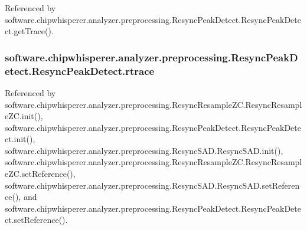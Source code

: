 Referenced by software.\+chipwhisperer.\+analyzer.\+preprocessing.\+Resync\+Peak\+Detect.\+Resync\+Peak\+Detect.\+get\+Trace().

\hypertarget{classsoftware_1_1chipwhisperer_1_1analyzer_1_1preprocessing_1_1ResyncPeakDetect_1_1ResyncPeakDetect_aa3ac6bab8c441f51c9d6fdf6798285fa}{}
\subsubsection[{rtrace}]{\setlength{\rightskip}{0pt plus 5cm}software.\+chipwhisperer.\+analyzer.\+preprocessing.\+Resync\+Peak\+Detect.\+Resync\+Peak\+Detect.\+rtrace}\label{classsoftware_1_1chipwhisperer_1_1analyzer_1_1preprocessing_1_1ResyncPeakDetect_1_1ResyncPeakDetect_aa3ac6bab8c441f51c9d6fdf6798285fa}


Referenced by software.\+chipwhisperer.\+analyzer.\+preprocessing.\+Resync\+Resample\+Z\+C.\+Resync\+Resample\+Z\+C.\+init(), software.\+chipwhisperer.\+analyzer.\+preprocessing.\+Resync\+Peak\+Detect.\+Resync\+Peak\+Detect.\+init(), software.\+chipwhisperer.\+analyzer.\+preprocessing.\+Resync\+S\+A\+D.\+Resync\+S\+A\+D.\+init(), software.\+chipwhisperer.\+analyzer.\+preprocessing.\+Resync\+Resample\+Z\+C.\+Resync\+Resample\+Z\+C.\+set\+Reference(), software.\+chipwhisperer.\+analyzer.\+preprocessing.\+Resync\+S\+A\+D.\+Resync\+S\+A\+D.\+set\+Reference(), and software.\+chipwhisperer.\+analyzer.\+preprocessing.\+Resync\+Peak\+Detect.\+Resync\+Peak\+Detect.\+set\+Reference().

\hypertarget{classsoftware_1_1chipwhisperer_1_1analyzer_1_1preprocessing_1_1ResyncPeakDetect_1_1ResyncPeakDetect_a3b7dd046990d2201be9e6e2790a18d5f}{}
